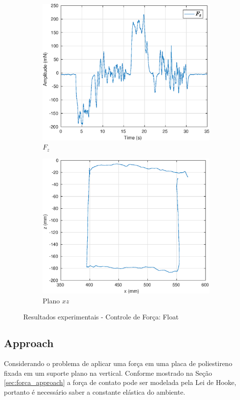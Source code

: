 \begin{figure}[H]
\begin{subfigure}{.5\textwidth}
  \centering
  \includegraphics[width=\linewidth]{./img/float2/Fz.eps}
  \caption{$F_z$}
  \label{fig:sub1}
\end{subfigure}%
\begin{subfigure}{.5\textwidth}
  \centering
  \includegraphics[width=\linewidth]{./img/float2/xz.eps}
  \caption{Plano $xz$}
  \label{fig:sub2}
\end{subfigure}
\caption{Resultados experimentais - Controle de Força: Float}
\label{fig:test}
\end{figure}

\subsection{Approach}
Considerando o problema de aplicar uma força em uma placa de poliestireno fixada em um suporte plano na vertical.  Conforme mostrado na Seção \ref{sec:forca_approach} a força de contato pode ser modelada pela Lei de Hooke, portanto é necessário saber a constante elástica do ambiente.

